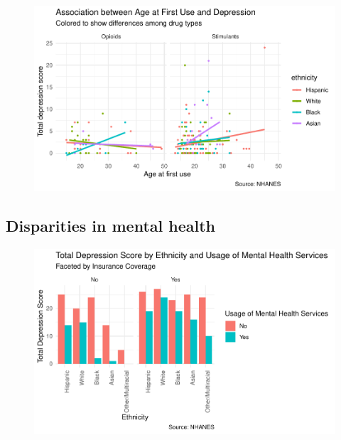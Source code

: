\documentclass[man]{apa6}
\begin{document}
\begin{figure}
\centering
\includegraphics{Final_Paper_Group_3_files/figure-latex/ST_fig4-1.pdf}
\caption{}
\end{figure}

\subsection{Disparities in mental
health}\label{disparities-in-mental-health}

\begin{figure}
\centering
\includegraphics{Final_Paper_Group_3_files/figure-latex/AG_fig5-1.pdf}
\caption{}
\end{figure}
\end{document}
